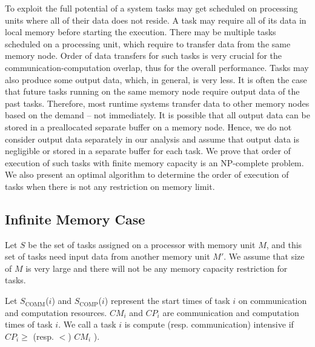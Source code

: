 \documentclass[sigconf]{acmart}
\newcommand{\scomm}{\ensuremath{{S}_{\text{COMM}}}}
\newcommand{\scomp}{\ensuremath{{S}_{\text{COMP}}}}
\begin{document}
	To exploit the full potential of a system tasks may get scheduled on processing
	units where all of their data does not reside. A task may require all of its data
	in local memory before starting the execution. There may be multiple tasks
	scheduled on a processing unit, which require to transfer data from the same
	memory node. Order of data transfers for such tasks is very crucial for the
	communication-computation overlap, thus for the overall performance. Tasks may
	also produce some output data, which, in general, is very less.  It is often the case that future tasks running on the same memory node require output data of the past tasks. Therefore, most runtime systems transfer data to other memory nodes based on the demand -- not immediately. It is possible that all output data can be stored in a preallocated separate buffer on a memory node. Hence, we do not consider output data separately in our analysis and assume that output data is negligible  or stored in a separate buffer for each task. We prove that order of execution of such tasks with finite memory capacity is an NP-complete problem. We also present an optimal algorithm to determine the order of execution of tasks when there is not any  restriction on memory limit.
	
	
	\subsection{Infinite Memory Case}
	Let $S$ be the set of tasks assigned on a processor with memory unit $M$, and this set of tasks  need input data from another memory unit $M'$. We assume that size of $M$ is very large and there will not be any memory capacity restriction for tasks.
	
	Let \scomm($i$) and  \scomp($i$) represent the start times of task $i$ on communication and computation resources. $CM_i$ and $CP_i$ are communication and computation times of task $i$. We call a task $i$ is compute (resp. communication) intensive if $CP_i $$\ge$ (resp. $<$) $CM_i$ ).
	
\end{document}
